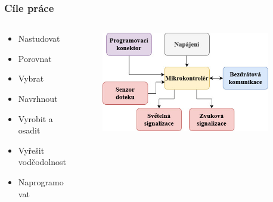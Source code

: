 \documentclass[%
  12pt,       				%
	t,                  %
	aspectratio=1610,   %
	unicode,						%
]{beamer}				    	%
\begin{document}
\begin{frame} 
	\frametitle{Cíle práce}

	\begin{columns}[T] 								%
		\begin{column}{0.25\textwidth}		%
			\begin{itemize}
				\item Nastudovat
				\item Porovnat
				\item Vybrat
				\item Navrhnout 
				\item Vyrobit a osadit 
				\item Vyřešit voděodolnost
				\item Naprogramovat
		\end{itemize}
		\end{column}
		\begin{column}{0.65\textwidth}		%
			\begin{figure}%
				\centering
				\vspace{0.4cm}	              %
				\includegraphics[width=1\columnwidth]{obrazky/zakladni_blokove_schema_prezentace.jpg}
			\end{figure}
		\end{column}
		\begin{column}{0.1\textwidth}		%
		\end{column}
	\end{columns}	
		
	\end{frame}
\end{document}
